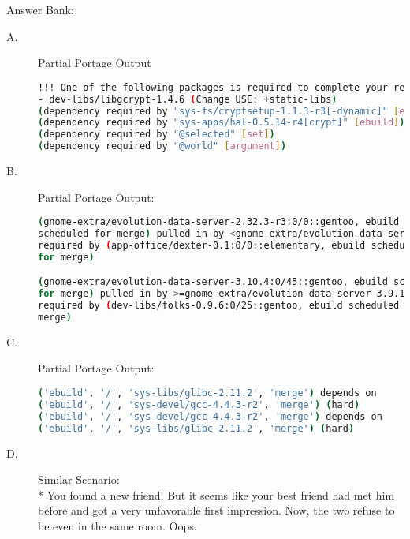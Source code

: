 \documentclass[11pt]{article}
\begin{document}
  \pagebreak
  Answer Bank:
  \begin{description}
    \item[A.] Partial Portage Output
    \begin{lstlisting}[basicstyle=\ttfamily, backgroundcolor = \color{lightgray}, language = bash, xleftmargin = -1cm, framexleftmargin = 1em, framexrightmargin = 6em, showstringspaces=false]
!!! One of the following packages is required to complete your request:
- dev-libs/libgcrypt-1.4.6 (Change USE: +static-libs)
(dependency required by "sys-fs/cryptsetup-1.1.3-r3[-dynamic]" [ebuild])
(dependency required by "sys-apps/hal-0.5.14-r4[crypt]" [ebuild])
(dependency required by "@selected" [set])
(dependency required by "@world" [argument])
\end{lstlisting}
 
    \item[B.] Partial Portage Output:
     \begin{lstlisting}[basicstyle=\ttfamily, backgroundcolor = \color{lightgray}, language = bash, xleftmargin = -.8cm, framexleftmargin = 1em, framexrightmargin = 6em, showstringspaces=false]
(gnome-extra/evolution-data-server-2.32.3-r3:0/0::gentoo, ebuild 
scheduled for merge) pulled in by <gnome-extra/evolution-data-server-3.5 
required by (app-office/dexter-0.1:0/0::elementary, ebuild scheduled 
for merge)

(gnome-extra/evolution-data-server-3.10.4:0/45::gentoo, ebuild scheduled 
for merge) pulled in by >=gnome-extra/evolution-data-server-3.9.1:=[vala] 
required by (dev-libs/folks-0.9.6:0/25::gentoo, ebuild scheduled for
merge)
\end{lstlisting}

    \item[C.] Partial Portage Output:
    \begin{lstlisting}[basicstyle=\ttfamily, backgroundcolor = \color{lightgray}, language = bash, xleftmargin = -.8cm, framexleftmargin = 1em, framexrightmargin = 6em, showstringspaces=false]
('ebuild', '/', 'sys-libs/glibc-2.11.2', 'merge') depends on
('ebuild', '/', 'sys-devel/gcc-4.4.3-r2', 'merge') (hard)
('ebuild', '/', 'sys-devel/gcc-4.4.3-r2', 'merge') depends on
('ebuild', '/', 'sys-libs/glibc-2.11.2', 'merge') (hard) 
\end{lstlisting}

   \item[D.] Similar Scenario:
    \\* You found a new friend! But it seems like your best friend had met him before and got a very unfavorable first impression. Now, the two refuse to be even in the same room. Oops.


\end{description}
\end{document}
